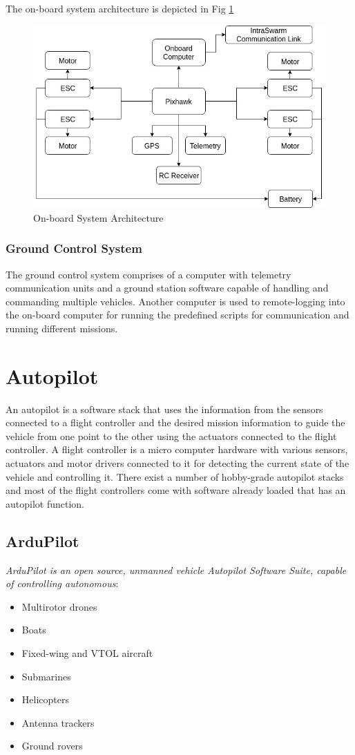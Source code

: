 \begin{spacing}{2}
\noindent The on-board system architecture is depicted in Fig \ref{fig:sysarch}
\begin{figure}[h]
    \centering
    \includegraphics[width=\linewidth, height = 7cm]{sysarc_1.jpg}
    \caption{On-board System Architecture}
    \label{fig:sysarch}
\end{figure}
\subsubsection*{Ground Control System}
The ground control system comprises of a computer with telemetry communication units and a ground station software capable of handling and commanding multiple vehicles. Another computer is used to remote-logging into the on-board computer for running the predefined scripts for communication and running different missions.

\section{Autopilot}
An autopilot is a software stack that uses the information from the sensors connected to a flight controller and the desired mission information to guide the vehicle from one point to the other using the actuators connected to the flight controller. A flight controller is a micro computer hardware with various sensors, actuators and motor drivers connected to it for detecting the current state of the vehicle and controlling it. There exist a number of hobby-grade autopilot stacks and most of the flight controllers come with software already loaded that has an autopilot function.

\subsection{ArduPilot}
\textit{ArduPilot is an open source, unmanned vehicle Autopilot Software Suite, capable of
controlling autonomous}:
\begin{itemize}
    \item Multirotor drones
    \item Boats
    \item Fixed-wing and VTOL aircraft 
    \item Submarines 
    \item Helicopters
    \item Antenna trackers
    \item Ground rovers
\end{itemize}


\end{spacing}
